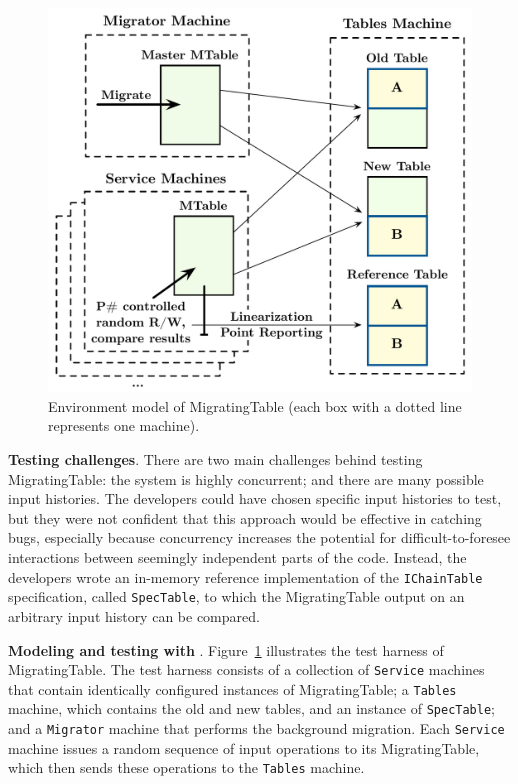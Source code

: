 \begin{figure}[t]
\centering
\includegraphics[width=\linewidth]{img/mocked_migration}
\caption{Environment model of MigratingTable (each box with a dotted line represents one \psharp machine).}
\label{fig:mockedmigration}
\end{figure}

\textbf{Testing challenges}.
There are two main challenges behind testing MigratingTable: the system is highly concurrent; and there are many possible input histories. The developers could have chosen specific input histories to test, but they were not confident that this approach would be effective in catching bugs, especially because concurrency increases the potential for difficult-to-foresee interactions between seemingly independent parts of the code. Instead, the developers wrote an in-memory reference implementation of the \texttt{IChainTable} specification, called \texttt{SpecTable}, to which the MigratingTable output on an arbitrary input history can be compared.

\textbf{Modeling and testing with \psharp}.
Figure~\ref{fig:mockedmigration} illustrates the \psharp test harness of MigratingTable. The test harness consists of a collection of \texttt{Service} machines that contain identically configured instances of MigratingTable; a \texttt{Tables} machine, which contains the old and new tables, and an instance of \texttt{SpecTable}; and a \texttt{Migrator} machine that performs the background migration. Each \texttt{Service} machine issues a random sequence of input operations to its MigratingTable, which then sends these operations to the \texttt{Tables} machine.

